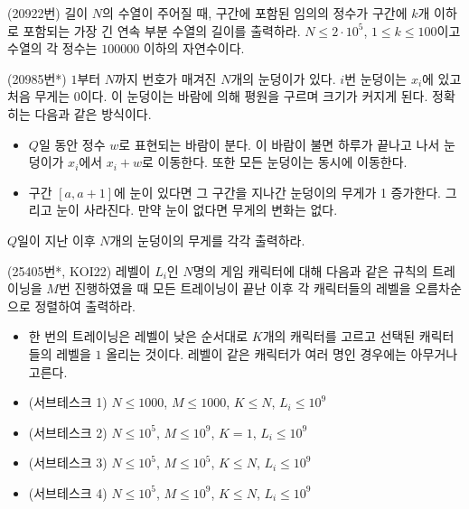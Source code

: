 \begin{problem}
    (20922번) 길이 $N$의 수열이 주어질 때, 구간에 포함된 임의의 정수가 구간에 $k$개 이하로 포함되는 가장 긴 연속 부분 수열의 길이를 출력하라. $N \leq 2 \cdot 10^5$, $1 \leq k \leq 100$이고 수열의 각 정수는 $100000$ 이하의 자연수이다.
\end{problem}

\begin{problem}
    (20985번*) $1$부터 $N$까지 번호가 매겨진 $N$개의 눈덩이가 있다. $i$번 눈덩이는 $x_i$에 있고 처음 무게는 0이다. 이 눈덩이는 바람에 의해 평원을 구르며 크기가 커지게 된다. 정확히는 다음과 같은 방식이다.
    \begin{itemize}
        \item $Q$일 동안 정수 $w$로 표현되는 바람이 분다. 이 바람이 불면 하루가 끝나고 나서 눈덩이가 $x_i$에서 $x_i + w$로 이동한다. 또한 모든 눈덩이는 동시에 이동한다.
        \item 구간 $[a, a+1]$에 눈이 있다면 그 구간을 지나간 눈덩이의 무게가 1 증가한다. 그리고 눈이 사라진다. 만약 눈이 없다면 무게의 변화는 없다.
    \end{itemize}
    $Q$일이 지난 이후 $N$개의 눈덩이의 무게를 각각 출력하라.
\end{problem}

\begin{problem}
    (25405번*, KOI22) 레벨이 $L_i$인 $N$명의 게임 캐릭터에 대해 다음과 같은 규칙의 트레이닝을 $M$번 진행하였을 때 모든 트레이닝이 끝난 이후 각 캐릭터들의 레벨을 오름차순으로 정렬하여 출력하라.
    \begin{itemize}
        \item 한 번의 트레이닝은 레벨이 낮은 순서대로 $K$개의 캐릭터를 고르고 선택된 캐릭터들의 레벨을 $1$ 올리는 것이다. 레벨이 같은 캐릭터가 여러 명인 경우에는 아무거나 고른다.
    \end{itemize}
    \begin{itemize}
        \item (서브테스크 1) $N \leq 1000$, $M \leq 1000$, $K \leq N$, $L_i \leq 10^9$
        \item (서브테스크 2) $N \leq 10^5$, $M \leq 10^9$, $K = 1$, $L_i \leq 10^9$
        \item (서브테스크 3) $N \leq 10^5$, $M \leq 10^5$, $K \leq N$, $L_i \leq 10^9$
        \item (서브테스크 4) $N \leq 10^5$, $M \leq 10^9$, $K \leq N$, $L_i \leq 10^9$
    \end{itemize}
\end{problem}

